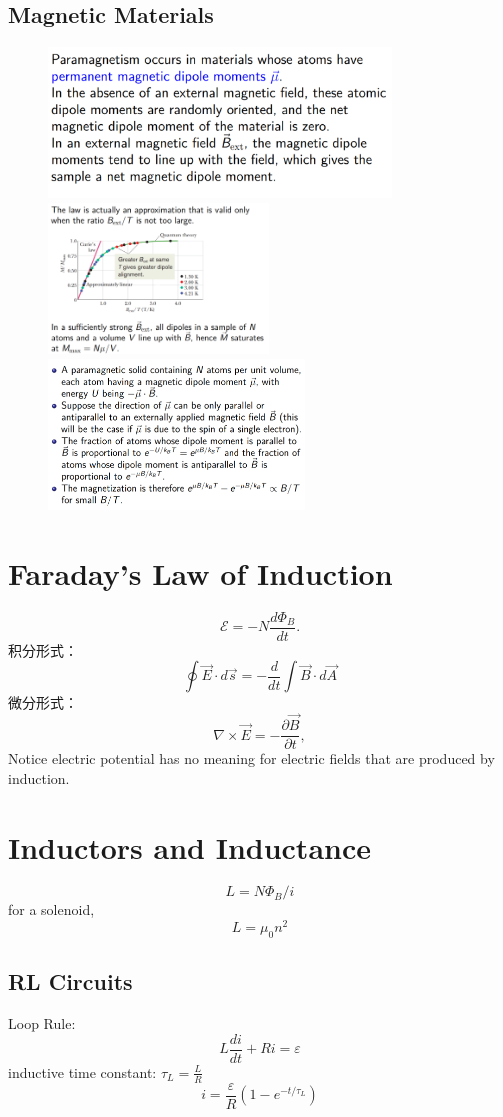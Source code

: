 \documentclass[11pt, a4paper]{article}
\begin{document}
\subsection{Magnetic Materials}
\begin{figure}[htbp]
    \centering
    \includegraphics[height = 4cm]{paramagnetism0.png}
    \includegraphics[height = 4cm]{paramagnetism1.png}
    \includegraphics[height = 4cm]{paramagnetic3.png}
\end{figure}

\section{Faraday’s Law of Induction}
$$\mathcal{E}=-N\frac{d\Phi_B}{dt}.$$
积分形式：
$$\oint\vec{E}\cdot d\vec{s}=-\frac d{dt}\int\vec{B}\cdot d\vec{A}$$
微分形式：
$$\nabla\times\vec{E}=-\frac{\partial\vec{B}}{\partial t},$$
Notice  electric potential has no meaning for electric fields that are
produced by induction.
\section{Inductors and Inductance}
$$L=N\Phi_B/i$$ 
for a solenoid, $$L = \mu_0 n^2 $$
\subsection{RL Circuits}
Loop Rule:
$$L\frac{di}{dt}+Ri=\varepsilon$$
inductive time constant: $\tau_L = \frac{L}{R}$
$$i= \frac{\varepsilon}{R}(1-e^{-t/\tau_L})$$
\end{document}
